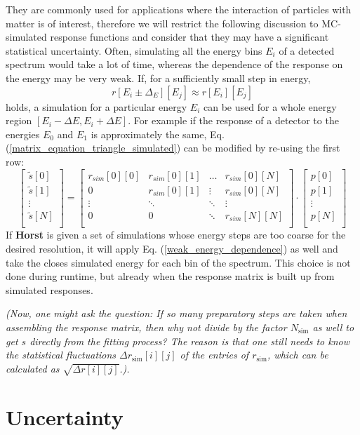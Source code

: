\documentclass{article}
\begin{document}
They are commonly used for applications where the interaction of particles with matter is of interest, therefore we will restrict the following discussion to MC-simulated response functions and consider that they may have a significant statistical uncertainty.
Often, simulating all the energy bins $E_i$ of a detected spectrum would take a lot of time, whereas the dependence of the response on the energy may be very weak.
If, for a sufficiently small step in energy,
%
\begin{equation}
\label{weak_energy_dependence}
r[E_i \pm \Delta_E][E_j] \approx r[E_i][E_j]
\end{equation}
%
holds, a simulation for a particular energy $E_i$ can be used for a whole energy region $\left[ E_i - \Delta E, E_i + \Delta E \right]$.
For example if the response of a detector to the energies $E_0$ and $E_1$ is approximately the same, Eq. (\ref{matrix_equation_triangle_simulated}) can be modified by re-using the first row:
%
\begin{equation}
	\label{matrix_equation_triangle_approximation}
	\left[ 
		\begin{array}{c}
			\tilde{s}[0] \\
			\tilde{s}[1] \\
			\vdots	\\
			\tilde{s}[N] \\
		\end{array}
	\right]
	= 
	\begin{bmatrix}
		r_{sim}[0][0] & r_{sim}[0][1] & \hdots & r_{sim}[0][N] \\
		0       & r_{sim}[0][1] & \vdots & r_{sim}[0][N] \\
		\vdots  & \ddots  & \ddots & \vdots  \\
		0       & 0       & \ddots & r_{sim}[N][N] \\
	\end{bmatrix}
	\cdot
	\left[ 
		\begin{array}{c}
			p[0] \\
			p[1] \\
			\vdots	\\
			p[N] \\
		\end{array}
	\right]
\end{equation}
%
If \textbf{Horst} is given a set of simulations whose energy steps are too coarse for the desired resolution, it will apply Eq. (\ref{weak_energy_dependence}) as well and take the closes simulated energy for each bin of the spectrum.
This choice is not done during runtime, but already when the response matrix is built up from simulated responses.

\textit{(Now, one might ask the question: If so many preparatory steps are taken when assembling the response matrix, then why not divide by the factor $N_\mathrm{sim}$ as well to get $s$ directly from the fitting process?
The reason is that one still needs to know the statistical fluctuations $\Delta r_\mathrm{sim}[i][j]$ of the entries of $r_\mathrm{sim}$, which can be calculated as $\sqrt{ \Delta r[i][j] }$.).}


\section{Uncertainty}
\label{Uncertainty}
\end{document}
